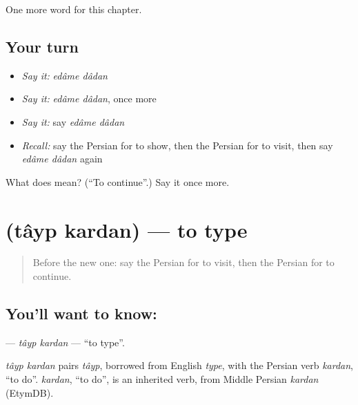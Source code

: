 \begin{grammarlens}[title={What you've built}]
One more word for this chapter.
\end{grammarlens}

\subsection*{Your turn}
\begin{itemize}
\raggedright
  \item \emph{Say it:} \emph{edâme dâdan}
  \item \emph{Say it:} \emph{edâme dâdan}, once more
  \item \emph{Say it:} say \emph{edâme dâdan}
  \item \emph{Recall:} say the Persian for to show, then the Persian for to visit, then say \emph{edâme dâdan} again
\end{itemize}

\begin{tcolorbox}[breakable,colback=teal!4,colframe=teal!35!black,title={Before you move on}]
What does   mean? (\textquotedblleft{}To continue\textquotedblright{}.) Say it once more.
\end{tcolorbox}
\section[\texorpdfstring{\fa{تایپ} \fa{کردن} (tâyp kardan)}{تایپ کردن (tâyp kardan)}]{  (tâyp kardan) — to type}

\label{lesson:FA-C144-tayp-kardan}



\begin{quote}
Before the new one: say the Persian for to visit, then the Persian for to continue.
\end{quote}

\subsection*{You'll want to know:  }
\textbf{ } — \emph{tâyp kardan} — \textquotedblleft{}to type\textquotedblright{}.

\begin{cousinweb}
\emph{tâyp kardan} pairs \emph{tâyp}, borrowed from English \emph{type}, with the Persian verb \emph{kardan}, \textquotedblleft{}to do\textquotedblright{}. \emph{kardan}, \textquotedblleft{}to do\textquotedblright{}, is an inherited verb, from Middle Persian \emph{kardan} (EtymDB).
\end{cousinweb}

